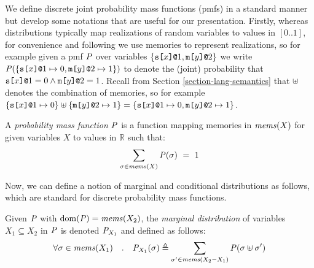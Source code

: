 We define discrete joint probability mass functions (pmfs) in a
standard manner but develop some notations that are useful for our
presentation. Firstly, whereas distributions typically map
realizations of random variables to values in $[0..1]$, for
convenience and following \cite{barthe2019probabilistic} we use
memories to represent realizations, so for example given a pmf $\mathit{P}$
over variables $\{ \texttt{s[}x\texttt{]}\texttt{@}1, \texttt{m[}y\texttt{]}\texttt{@}2 \}$ we write $\mathit{P}(\{
\texttt{s[}x\texttt{]}\texttt{@}1 \mapsto 0, \texttt{m[}y\texttt{]}\texttt{@}2 \mapsto 1 \})$ to
denote the (joint) probability that $\texttt{s[}x\texttt{]}\texttt{@}1 = 0 \wedge
\texttt{m[}y\texttt{]}\texttt{@}2 = 1$. Recall from Section
\ref{section-lang-semantics} that $\uplus$ denotes the combination of
memories, so for example $\{ \texttt{s[}x\texttt{]}\texttt{@}1 \mapsto 0\} \uplus
\{\texttt{m[}y\texttt{]}\texttt{@}2 \mapsto 1 \} = \{ \texttt{s[}x\texttt{]}\texttt{@}1 \mapsto 0,
\texttt{m[}y\texttt{]}\texttt{@}2 \mapsto 1 \}$.
\begin{definition}
  A \emph{probability mass function} $\mathit{P}$ is a function
  mapping memories in $\mathit{mems}(X)$ for given variables $X$ to
  values in $\mathbb{R}$ such that:
  $$
  \sum_{\sigma \in \mathit{mems}(X)} \mathit{P}(\sigma) \  = \ 1
  $$
\end{definition}
Now, we can define a notion of marginal and conditional
distributions as follows, which are standard for discrete
probability mass functions. 
\begin{definition}
  Given $\mathit{P}$ with $\mathrm{dom}(\mathit{P}) = \mathit{mems}(X_2)$, the \emph{marginal distribution}
  of variables $X_1 \subseteq X_2$ in $\mathit{P}$ is denoted ${\mathit{P}}_{X_1}$ and defined as follows:
  $$
  \forall \sigma \in \mathit{mems}(X_1) \quad . \quad {\mathit{P}}_{X_1}(\sigma) \triangleq
  \sum_{\sigma' \in \mathit{mems}(X_2-X_1)} \mathit{P}(\sigma \uplus \sigma')
  $$
\end{definition}

